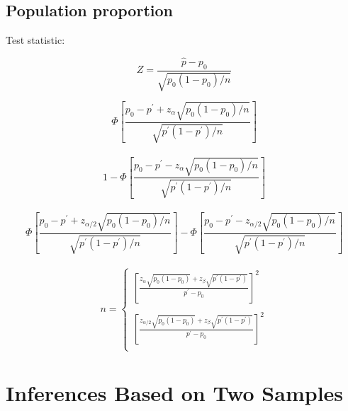 \documentclass[UTF8]{ctexart}
\numberwithin{equation}{subsection}%
\begin{document}
	\subsection{Population proportion}
	Test statistic:
	\begin{Large}
		$$Z = \frac{\hat{p}-p_{\scriptscriptstyle 0}}{\sqrt{ p_{\scriptscriptstyle 0}(1-p_{\scriptscriptstyle 0})/n}}$$
		
		$$\varPhi\left[\frac{p_{\scriptscriptstyle 0}-p^{\scriptscriptstyle '}+z_\alpha\sqrt{ p_{\scriptscriptstyle 0}(1-p_{\scriptscriptstyle 0})/n}}{\sqrt{ p^{\scriptscriptstyle '}(1-p^{\scriptscriptstyle '})/n}}\right]$$
		~\\		
		$$1-\varPhi\left[\frac{p_{\scriptscriptstyle 0}-p^{\scriptscriptstyle '}-z_\alpha\sqrt{ p_{\scriptscriptstyle 0}(1-p_{\scriptscriptstyle 0})/n}}{\sqrt{ p^{\scriptscriptstyle '}(1-p^{\scriptscriptstyle '})/n}}\right]$$
		~\\		
		$$\varPhi\left[\frac{p_{\scriptscriptstyle 0}-p^{\scriptscriptstyle '}+z_{\alpha/2}\sqrt{ p_{\scriptscriptstyle 0}(1-p_{\scriptscriptstyle 0})/n}}{\sqrt{ p^{\scriptscriptstyle '}(1-p^{\scriptscriptstyle '})/n}}\right]
		-\varPhi\left[\frac{p_{\scriptscriptstyle 0}-p^{\scriptscriptstyle '}-z_{\alpha/2}\sqrt{ p_{\scriptscriptstyle 0}(1-p_{\scriptscriptstyle 0})/n}}{\sqrt{ p^{\scriptscriptstyle '}(1-p^{\scriptscriptstyle '})/n}}\right]$$
		~\\
		$$n=\begin{cases}
			\left[\frac{z_\alpha\sqrt{p_{\scriptscriptstyle 0}(1-p_{\scriptscriptstyle 0})}+z_\beta\sqrt{p^{\scriptscriptstyle '}(1-p^{\scriptscriptstyle '})}}{p^{\scriptscriptstyle '}-p_{\scriptscriptstyle 0}}\right]^2\\
			~\\
			\left[\frac{z_{\alpha/2}\sqrt{p_{\scriptscriptstyle 0}(1-p_{\scriptscriptstyle 0})}+z_\beta\sqrt{p^{\scriptscriptstyle '}(1-p^{\scriptscriptstyle '})}}{p^{\scriptscriptstyle '}-p_{\scriptscriptstyle 0}}\right]^2\\
		\end{cases}$$
	\end{Large}
	\section{Inferences Based on Two Samples}
\end{document}
